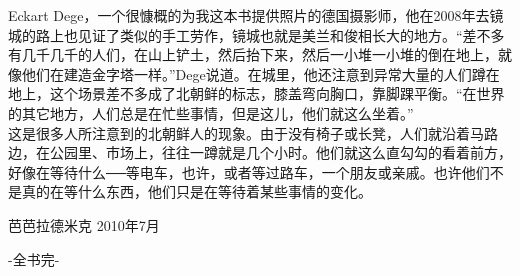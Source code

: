 Eckart Dege，一个很慷概的为我这本书提供照片的德国摄影师，他在2008年去镜城的路上也见证了类似的手工劳作，镜城也就是美兰和俊相长大的地方。“差不多有几千几千的人们，在山上铲土，然后抬下来，然后一小堆一小堆的倒在地上，就像他们在建造金字塔一样。”Dege说道。在城里，他还注意到异常大量的人们蹲在地上，这个场景差不多成了北朝鲜的标志，膝盖弯向胸口，靠脚踝平衡。“在世界的其它地方，人们总是在忙些事情，但是这儿，他们就这么坐着。”\\

这是很多人所注意到的北朝鲜人的现象。由于没有椅子或长凳，人们就沿着马路边，在公园里、市场上，往往一蹲就是几个小时。他们就这么直勾勾的看着前方，好像在等待什么──等电车，也许，或者等过路车，一个朋友或亲戚。也许他们不是真的在等什么东西，他们只是在等待着某些事情的变化。\\

\begin{flushright}
	芭芭拉德米克 2010年7月
\end{flushright}


\begin{center}
	-全书完-
\end{center}